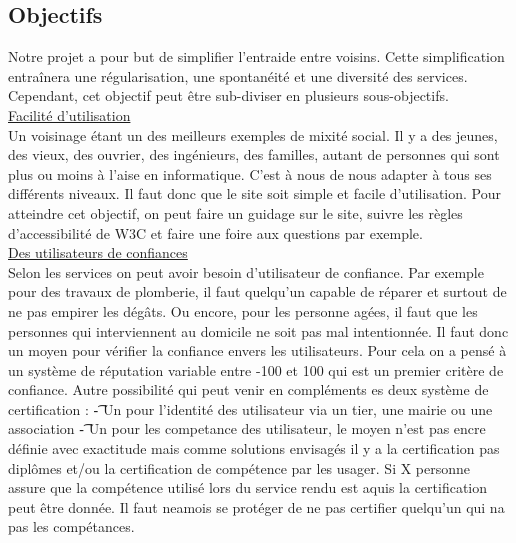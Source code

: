 \documentclass[a4paper,11pt]{article}
\begin{document}
\subsection{Objectifs}

Notre projet a pour but de simplifier l’entraide entre voisins. Cette simplification entraînera une
régularisation, une spontanéité et une diversité des services.\\

Cependant, cet objectif peut être sub-diviser en plusieurs sous-objectifs.\\





\underline{Facilité d'utilisation}\\

Un voisinage étant un des meilleurs exemples de mixité social.
Il y a des jeunes, des vieux, des ouvrier, des ingénieurs, des familles, autant de personnes qui sont plus ou moins à l'aise en informatique.
C'est à nous de nous adapter à tous ses différents niveaux. Il faut donc que le site soit simple et facile d'utilisation.
Pour atteindre cet objectif, on peut faire un guidage sur le site, suivre les règles d'accessibilité de W3C et faire une foire aux questions par exemple.\\

\underline{Des utilisateurs de confiances}\\

Selon les services on peut avoir besoin d'utilisateur de confiance.
Par exemple pour des travaux de plomberie, il faut quelqu'un capable de réparer et surtout de ne pas empirer les dégâts.
Ou encore, pour les personne agées, il faut que les personnes qui interviennent au domicile ne soit pas mal intentionnée.
Il faut donc un moyen pour vérifier la confiance envers les utilisateurs.
Pour cela on a pensé à un système de réputation variable entre -100 et 100 qui est un premier critère de confiance.
Autre possibilité qui peut venir en compléments es deux système de certification :
\t- Un pour l'identité des utilisateur via un tier, une mairie ou une association
\t- Un pour les competance des utilisateur,
le moyen n'est pas encre définie avec exactitude mais comme solutions envisagés il y a la certification pas diplômes et/ou la certification de compétence par les usager.
Si X personne assure que la compétence utilisé lors du service rendu est aquis la certification peut être donnée.
Il faut neamois se protéger de ne pas certifier quelqu'un qui na pas les compétances.\\
\end{document}
